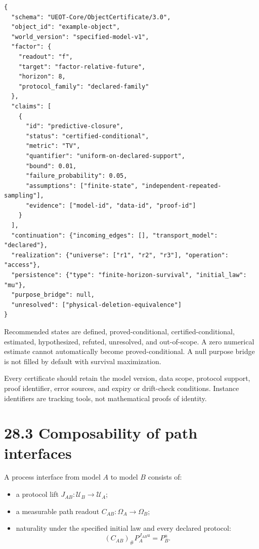\documentclass[
  english,
  11pt,
  oneside]{book}
\providecommand{\tightlist}{%
  \setlength{\itemsep}{0pt}\setlength{\parskip}{0pt}}
\begin{document}
\begin{verbatim}
{
  "schema": "UEOT-Core/ObjectCertificate/3.0",
  "object_id": "example-object",
  "world_version": "specified-model-v1",
  "factor": {
    "readout": "f",
    "target": "factor-relative-future",
    "horizon": 8,
    "protocol_family": "declared-family"
  },
  "claims": [
    {
      "id": "predictive-closure",
      "status": "certified-conditional",
      "metric": "TV",
      "quantifier": "uniform-on-declared-support",
      "bound": 0.01,
      "failure_probability": 0.05,
      "assumptions": ["finite-state", "independent-repeated-sampling"],
      "evidence": ["model-id", "data-id", "proof-id"]
    }
  ],
  "continuation": {"incoming_edges": [], "transport_model": "declared"},
  "realization": {"universe": ["r1", "r2", "r3"], "operation": "access"},
  "persistence": {"type": "finite-horizon-survival", "initial_law": "mu"},
  "purpose_bridge": null,
  "unresolved": ["physical-deletion-equivalence"]
}
\end{verbatim}

Recommended states are defined, proved-conditional, certified-conditional, estimated, hypothesized, refuted, unresolved, and out-of-scope. A zero numerical estimate cannot automatically become proved-conditional. A null purpose bridge is not filled by default with survival maximization.

Every certificate should retain the model version, data scope, protocol support, proof identifier, error sources, and expiry or drift-check conditions. Instance identifiers are tracking tools, not mathematical proofs of identity.

\section{28.3 Composability of path interfaces}\label{composability-of-path-interfaces}

A process interface from model \(A\) to model \(B\) consists of:

\begin{itemize}
\tightlist
\item
  a protocol lift \(J_{AB}:\mathcal U_B\to\mathcal U_A\);
\item
  a measurable path readout \(C_{AB}:\Omega_A\to\Omega_B\);
\item
  naturality under the specified initial law and every declared protocol: \[(C_{AB})_\#P_A^{J_{AB}u}=P_B^u.\]
\end{itemize}

\hypertarget{p-api-01}{}\label{p-api-01}
\end{document}
